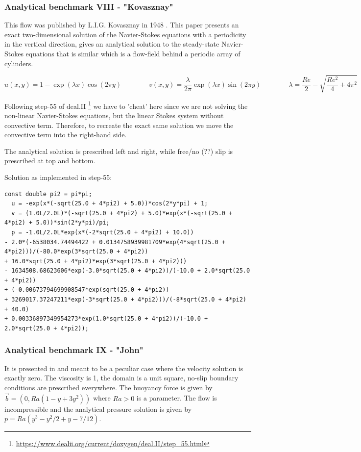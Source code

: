 \subsubsection{Analytical benchmark VIII \label{mms8} - "Kovasznay"}

This flow was published by L.I.G. Kovasznay in 1948 \cite{kova48}. 
This paper presents an exact two-dimensional solution of the Navier-Stokes equations 
with a periodicity in the vertical direction, 
gives an analytical solution to the steady-state Navier-Stokes equations that is similar
which is a flow-field behind a periodic array of cylinders.

\[
u(x,y)=1-\exp(\lambda x) \cos (2\pi y)
\qquad
\qquad
v(x,y)=\frac{\lambda}{2\pi} \exp(\lambda x) \sin (2 \pi y)
\qquad
\qquad
\lambda=\frac{Re}{2}-\sqrt{\frac{Re^2}{4}+4\pi^2}
\]

Following step-55 of deal.II \footnote{\url{https://www.dealii.org/current/doxygen/deal.II/step_55.html}}
we have to 'cheat' here since we are not solving the non-linear Navier-Stokes equations, but the linear Stokes system without convective term. Therefore, to recreate the exact same solution
we move the convective term into the right-hand side.

The analytical solution is prescribed left and right, while free/no (??) slip is prescribed at top and bottom.

Solution as implemented in step-55:
\begin{verbatim}
const double pi2 = pi*pi;
  u = -exp(x*(-sqrt(25.0 + 4*pi2) + 5.0))*cos(2*y*pi) + 1;
  v = (1.0L/2.0L)*(-sqrt(25.0 + 4*pi2) + 5.0)*exp(x*(-sqrt(25.0 + 4*pi2) + 5.0))*sin(2*y*pi)/pi;
  p = -1.0L/2.0L*exp(x*(-2*sqrt(25.0 + 4*pi2) + 10.0)) 
- 2.0*(-6538034.74494422 + 0.0134758939981709*exp(4*sqrt(25.0 + 4*pi2)))/(-80.0*exp(3*sqrt(25.0 + 4*pi2)) 
+ 16.0*sqrt(25.0 + 4*pi2)*exp(3*sqrt(25.0 + 4*pi2))) 
- 1634508.68623606*exp(-3.0*sqrt(25.0 + 4*pi2))/(-10.0 + 2.0*sqrt(25.0 + 4*pi2)) 
+ (-0.00673794699908547*exp(sqrt(25.0 + 4*pi2)) 
+ 3269017.37247211*exp(-3*sqrt(25.0 + 4*pi2)))/(-8*sqrt(25.0 + 4*pi2) + 40.0) 
+ 0.00336897349954273*exp(1.0*sqrt(25.0 + 4*pi2))/(-10.0 + 2.0*sqrt(25.0 + 4*pi2));
\end{verbatim}


\subsubsection{Analytical benchmark IX \label{mms9} - "John"}

It is presented in \cite{jolm17} and meant to be a peculiar case where the velocity solution 
is exactly zero. The viscosity is 1, the domain is a unit square, no-slip boundary conditions 
are prescribed everywhere. The buoyancy force is given by $\vec{b}=(0,Ra(1-y+3y^2))$ where 
$Ra>0$ is a parameter. The flow is incompressible and the analytical pressure solution 
is given by $p=Ra(y^3-y^2/2+y-7/12)$.






